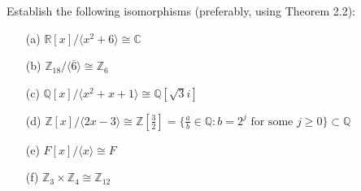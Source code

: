   \begin{exercise}[Shifrin 4.2.3.a/c/e]
    Establish the following isomorphisms (preferably, using Theorem 2.2):
    \begin{enumerate}
      \item[(a)] $\mathbb{R}[x]/ \langle x^2 + 6 \rangle \cong \mathbb{C}$
      \item[(b)] $\mathbb{Z}_{18}/\langle\overline{6}\rangle \cong \mathbb{Z}_6$
      \item[(c)] $\mathbb{Q}[x]/\langle x^2 + x + 1 \rangle \cong \mathbb{Q}[\sqrt{3}i]$
      \item[(d)] $\mathbb{Z}[x]/\langle 2x - 3 \rangle \cong \mathbb{Z}[\frac{3}{2}] = \{\frac{a}{b} \in \mathbb{Q} : b = 2^j \text{ for some } j \geq 0\} \subset \mathbb{Q}$
      \item[(e)] $F[x]/\langle x \rangle \cong F$
      \item[(f)] $\mathbb{Z}_3 \times \mathbb{Z}_4 \cong \mathbb{Z}_{12}$
    \end{enumerate}
  \end{exercise}

